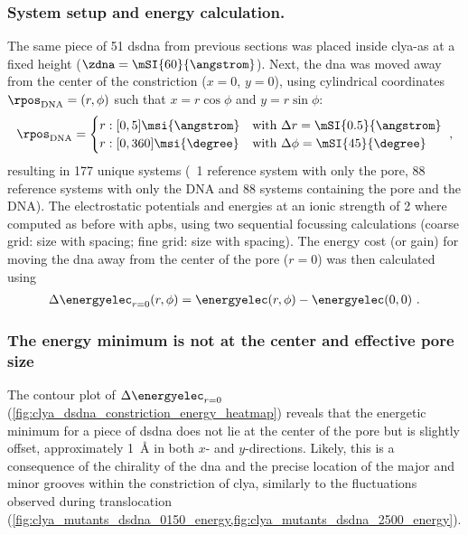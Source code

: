 \subsubsection{System setup and energy calculation.}
%

The same piece of \SI{51}{\bp} \gls{dsdna} from previous sections was placed inside \gls{clya-as} at a fixed
height ($\zdna = \mSI{60}{\angstrom}$). Next, the \gls{dna} was moved away from the center of the
constriction ($x = 0$, $y = 0$), using cylindrical coordinates $\rpos_{\mathrm{DNA}} = (r, \phi)$ such that
$x = r \cos{\phi}$ and $y = r \sin{\phi}$:
%
\begin{equation}
  \rpos_{\mathrm{DNA}} = %
  \begin{cases}
    r: [0,5] \msi{\angstrom} &\mbox{with } \Delta r    = \mSI{0.5}{\angstrom} \\
    r: [0,360] \msi{\degree} &\mbox{with } \Delta \phi = \mSI{45}{\degree} \\
  \end{cases}
  \text{ ,}
\end{equation}
%
resulting in 177 unique systems (\ie~1 reference system with only the pore, 88 reference systems with only the
DNA and 88 systems containing the pore and the DNA). The electrostatic potentials and energies at an ionic
strength of \SI{2}{\Molar} where computed as before with \gls{apbs}, using two sequential focussing
calculations (coarse grid:  size with
 spacing; fine grid:  size with
 spacing). The energy cost (or gain) for moving the \gls{dna} away from
the center of the pore ($r = 0$) was then calculated using
%
\begin{align}\label{eq:electrostatics_deltadelta_energy}
  \Delta \energyelec_{r=0} (r, \phi) = \energyelec (r, \phi) - \energyelec (0,0)
  \text{  .}
\end{align}
%

\subsubsection{The energy minimum is not at the center and effective pore size}
%


The contour plot of $\Delta \energyelec_{r=0}$ (\cref{fig:clya_dsdna_constriction_energy_heatmap}) reveals
that the energetic minimum for a piece of \gls{dsdna} does not lie at the center of the pore but is slightly
offset, approximately \SI{1}{\angstrom} in both $x$- and $y$-directions. Likely, this is a consequence of the
chirality of the \gls{dna} and the precise location of the major and minor grooves within the constriction of
\gls{clya}, similarly to the fluctuations observed during translocation
(\cref{fig:clya_mutants_dsdna_0150_energy,fig:clya_mutants_dsdna_2500_energy}). 

